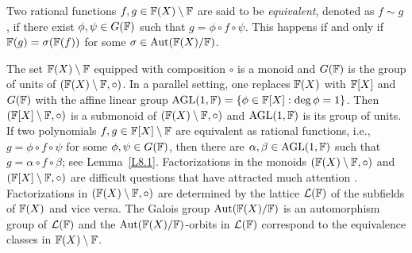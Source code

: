 \documentclass{amsart}
\numberwithin{equation}{section}
\theoremstyle{definition}
\newcommand{\f}{\Bbb F}
\begin{document}
Two rational functions $f,g\in\f(X)\setminus\f$ are said to be {\em equivalent}, denoted as $f\sim g$, if there exist $\phi,\psi\in G(\f)$ such that $g=\phi\circ f\circ \psi$. This happens if and only if $\f(g)=\sigma(\f(f))$ for some $\sigma\in\text{Aut}(\f(X)/\f)$. 

The set $\f(X)\setminus \f$ equipped with composition $\circ$ is a monoid and $G(\f)$ is the group of units of $(\f(X)\setminus\f,\circ)$. In a parallel setting, one replaces $\f(X)$ with $\f[X]$ and $G(\f)$ with the affine linear group $\text{AGL}(1,\f)=\{\phi\in\f[X]:\deg\phi=1\}$. Then $(\f[X]\setminus\f,\circ)$ is a submonoid of $(\f(X)\setminus\f,\circ)$ and $\text{AGL}(1,\f)$ is its group of units. If two polynomials $f,g\in\f[X]\setminus\f$ are equivalent as rational functions, i.e., $g=\phi\circ f\circ \psi$ for some $\phi,\psi\in G(\f)$, then there are $\alpha,\beta\in\text{AGL}(1,\f)$ such that $g=\alpha\circ f\circ\beta$; see Lemma~\ref{L8.1}. Factorizations in the monoids $(\f(X)\setminus\f,\circ)$ and $(\f[X]\setminus\f,\circ)$ are difficult questions that have attracted much attention \cite{Alonso-Gutierrez-Recio-JSC-1995, Ayad-Fleischmann-JSC-2008, Barton-Zippel-JSC-1985, Fuchs-Petho-PAMS-2011, Fuchs-Zannier-JEMS-2012, vonzurGathen-Weiss-JSC-1995, Zippel-ISSAC-1991}. Factorizations in $(\f(X)\setminus\f,\circ)$ are determined by the lattice $\mathcal L(\f)$ of the subfields of $\f(X)$ and vice versa. The Galois group $\text{Aut}(\f(X)/\f)$ is an automorphism group of $\mathcal L(\f)$ and the $\text{Aut}(\f(X)/\f)$-orbits in $\mathcal L(\f)$ correspond to the equivalence classes in $\f(X)\setminus\f$.
\end{document}
